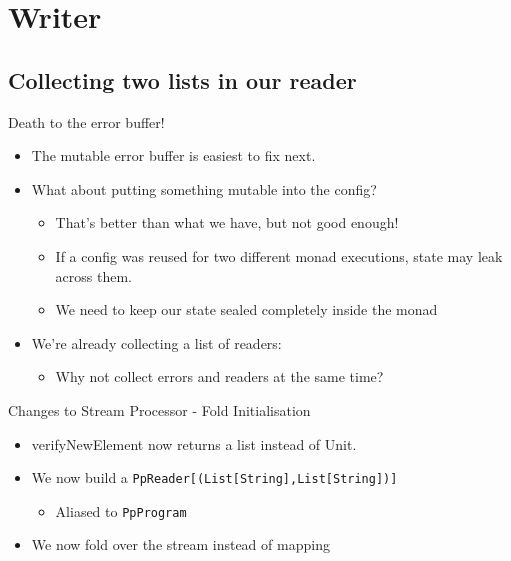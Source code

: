 \documentclass[professionalFonts,aspectratio=169]{beamer}
\begin{document}
\section{Writer}

\subsection{Collecting two lists in our reader}

\begin{frame}{Death to the error buffer!}
\begin{itemize}
\item The mutable error buffer is easiest to fix next.
\pause \item What about putting something mutable into the config?
  \begin{itemize}
    \pause \item That's better than what we have, but not good enough!
    \pause \item If a config was reused for two different monad executions, state may leak across them.
    \pause \item We need to keep our state sealed completely inside the monad
  \end{itemize}
\pause \item We're already collecting a list of readers:
  \begin{itemize}
    \pause \item Why not collect errors and readers at the same time? 
  \end{itemize}
\end{itemize}
\end{frame}

\begin{frame}{Changes to Stream Processor - Fold Initialisation}



\begin{itemize}
\item verifyNewElement now returns a list instead of Unit.
\pause \item We now build a \texttt{PpReader[(List[String],List[String])]} 
  \begin{itemize}
    \item Aliased to \texttt{PpProgram}
  \end{itemize}
\pause \item We now fold over the stream instead of mapping
\end{itemize}


\end{frame}
\end{document}
